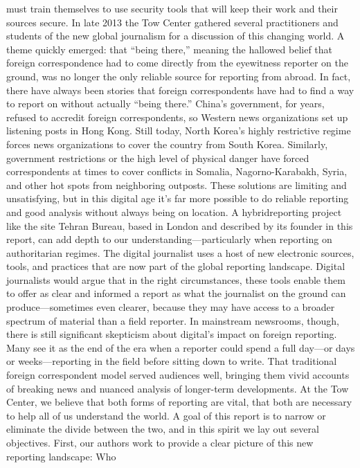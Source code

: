 must train themselves to use security tools that will keep their work and their sources
secure.
In late 2013 the Tow Center gathered several practitioners and students of the new global
journalism for a discussion of this changing world. A theme quickly emerged: that ``being
there,'' meaning the hallowed belief that foreign correspondence had to come directly
from the eyewitness reporter on the ground, was no longer the only reliable source for
reporting from abroad.
In fact, there have always been stories that foreign correspondents have had to find a way
to report on without actually ``being there.'' China’s government, for years, refused to
accredit foreign correspondents, so Western news organizations set up listening posts in
Hong Kong. Still today, North Korea’s highly restrictive regime forces news
organizations to cover the country from South Korea. Similarly, government restrictions
or the high level of physical danger have forced correspondents at times to cover conflicts
in Somalia, Nagorno-Karabakh, Syria, and other hot spots from neighboring outposts.
These solutions are limiting and unsatisfying, but in this digital age it’s far more possible
to do reliable reporting and good analysis without always being on location. A hybridreporting
project like the site Tehran Bureau, based in London and described by its
founder in this report, can add depth to our understanding—particularly when reporting
on authoritarian regimes.
The digital journalist uses a host of new electronic sources, tools, and practices that are
now part of the global reporting landscape. Digital journalists would argue that in the
right circumstances, these tools enable them to offer as clear and informed a report as
what the journalist on the ground can produce—sometimes even clearer, because they
may have access to a broader spectrum of material than a field reporter.
In mainstream newsrooms, though, there is still significant skepticism about digital’s
impact on foreign reporting. Many see it as the end of the era when a reporter could
spend a full day—or days or weeks—reporting in the field before sitting down to write.
That traditional foreign correspondent model served audiences well, bringing them vivid
accounts of breaking news and nuanced analysis of longer-term developments.
At the Tow Center, we believe that both forms of reporting are vital, that both are
necessary to help all of us understand the world. A goal of this report is to narrow or
eliminate the divide between the two, and in this spirit we lay out several objectives.
First, our authors work to provide a clear picture of this new reporting landscape: Who
